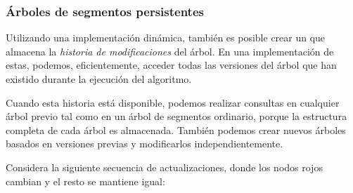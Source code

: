 \subsubsection{Árboles de segmentos persistentes}


Utilizando una implementación dinámica, también es posible crear un
 que almacena la \emph{historia
    de modificaciones} del árbol. En una implementación de estas, podemos,
eficientemente, acceder todas las versiones del árbol que han existido
durante la ejecución del algoritmo.

Cuando esta historia está disponible, podemos realizar consultas en cualquier
árbol previo tal como en un árbol de segmentos ordinario, porque la
estructura completa de cada árbol es almacenada. También podemos crear nuevos
árboles basados en versiones previas y modificarlos independientemente.

\pagebreak
Considera la siguiente secuencia de actualizaciones, donde los nodos rojos
cambian y el resto se mantiene igual:

